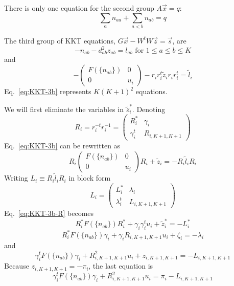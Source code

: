 \documentclass{article}
\newcommand*{\abcd}[4]{\left( \begin{array}{cc} #1 & #2 \\ #3 & #4 \end{array} \right)}
\newcommand*{\mat}[1]{\tilde{#1}}
\begin{document}
There is only one equation for the second group $A \vec{x} = q$:
\begin{equation}
\sum_a n_{aa} + \sum_{a<b} n_{ab} = q
\label{eq:KKT-n-sum}
\end{equation}

The third group of KKT equations, $G\vec{x} - W^t W \vec{z} = \vec{s}$, are
\begin{equation}
-n_{ab} - d_{ab}^2 z_{ab} = l_{ab} \text{ for } 1\leq a \leq b \leq K
\label{eq:KKT-3a}
\end{equation}
and
\begin{equation}
-\abcd{F( \{ n_{ab} \})}{0}{0}{u_i} - r_i r_i^t \mat{z}_i r_i r_i^t = \mat{l}_i
\label{eq:KKT-3b}
\end{equation}
Eq.~\ref{eq:KKT-3b} represents $K(K+1)^2$ equations.

We will first eliminate the variables in $\mat{z}_i^\ast$. Denoting
\begin{equation}
R_i = r_i^{-t} r_i^{-1} = \left(
  \begin{array}{cc}
    R_i^\ast & \gamma_i \\
    \gamma_i^t & R_{i,K+1,K+1} 
  \end{array}\right)
\end{equation}
Eq.~\ref{eq:KKT-3b} can be rewritten as
\begin{equation}
R_i \abcd{F(\{n_{ab}\})}{0}{0}{u_i} R_i + \mat{z}_i = - R_i \mat{l}_i R_i
\label{eq:KKT-3b-R}
\end{equation}
Writing $L_i \equiv R_i \mat{l}_i R_i$ in block form
\begin{equation}
L_i = \left(
\begin{array}{cc}
  L_i^\ast & \lambda_i \\
  \lambda_i^t & L_{i,K+1,K+1} 
\end{array} \right)
\end{equation}
Eq.~\ref{eq:KKT-3b-R} becomes 
\begin{equation}
R_i^\ast F( \{n_{ab}\}) R_i^\ast + \gamma_i \gamma_i^t u_i + \mat{z}_i^\ast = - L_i^\ast
\label{eq:KKT-Fuz}
\end{equation}
\begin{equation}
R_i^\ast F( \{n_{ab}\}) \gamma_i + \gamma_i R_{i,K+1,K+1} u_i + \zeta_i = - \lambda_i
\label{eq:KKT-n-u-zeta}
\end{equation}
and
\begin{equation}
\gamma_i^t F( \{ n_{ab}\})\gamma_i + R_{i,K+1,K+1}^2 u_i + z_{i,K+1,K+1} = -L_{i,K+1,K+1}
\end{equation}
Because $z_{i,K+1,K+1} = -\pi_i$, the last equation is
\begin{equation}
\gamma_i^t F( \{ n_{ab}\})\gamma_i + R_{i,K+1,K+1}^2 u_i = \pi_i - L_{i,K+1,K+1}
\label{eq:KKT-n-u}
\end{equation}
\end{document}
